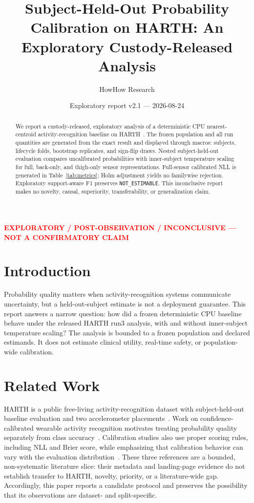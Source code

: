 \documentclass[11pt]{article}
\title{Subject-Held-Out Probability Calibration on HARTH: An Exploratory Custody-Released Analysis}
\author{HowHow Research}
\date{Exploratory report v2.1 --- 2026-08-24}
\newcommand{\status}[1]{\textcolor{red}{\textbf{#1}}}
\begin{document}

\maketitle
\begin{center}\status{EXPLORATORY / POST-OBSERVATION / INCONCLUSIVE --- NOT A CONFIRMATORY CLAIM}\end{center}
\begin{abstract}
We report a custody-released, exploratory analysis of a deterministic CPU nearest-centroid activity-recognition baseline on HARTH~\cite{harth}. The frozen population and all run quantities are generated from the exact result and displayed through macros: \resultSubjects{} subjects, \resultFolds{} lifecycle folds, \bootstrapReplicates{} bootstrap replicates, and \signFlipDraws{} sign-flip draws. Nested subject-held-out evaluation compares uncalibrated probabilities with inner-subject temperature scaling for full, back-only, and thigh-only sensor representations. Full-sensor calibrated NLL is generated in Table~\ref{tab:metrics}; Holm adjustment yields no familywise rejection. Exploratory support-aware F1 preserves \texttt{NOT\_ESTIMABLE}. This inconclusive report makes no novelty, causal, superiority, transferability, or generalization claim.
\end{abstract}

\section{Introduction}
Probability quality matters when activity-recognition systems communicate uncertainty, but a held-out-subject estimate is not a deployment guarantee. This report answers a narrow question: how did a frozen deterministic CPU baseline behave under the released HARTH run3 analysis, with and without inner-subject temperature scaling? The analysis is bounded to a frozen population and declared estimands. It does not estimate clinical utility, real-time safety, or population-wide calibration.

\section{Related Work}
HARTH is a public free-living activity-recognition dataset with subject-held-out baseline evaluation and two accelerometer placements~\cite{harth}. Work on confidence-calibrated wearable activity recognition motivates treating probability quality separately from class accuracy~\cite{harcal}. Calibration studies also use proper scoring rules, including NLL and Brier score, while emphasizing that calibration behavior can vary with the evaluation distribution~\cite{proper}. These three references are a bounded, non-systematic literature slice: their metadata and landing-page evidence do not establish transfer to HARTH, novelty, priority, or a literature-wide gap. Accordingly, this paper reports a candidate protocol and preserves the possibility that its observations are dataset- and split-specific.
\end{document}
